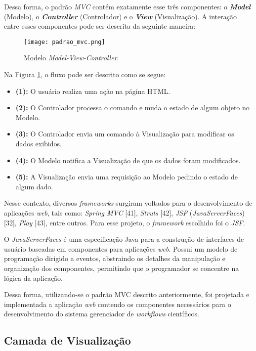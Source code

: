 Dessa forma, o padrão \textit{MVC} contém exatamente esse três componentes: o \textbf{\textit{Model}} (Modelo), o \textbf{\textit{Controller}} (Controlador) e o \textbf{\textit{View}} (Visualização). A interação entre esses componentes pode ser descrita da seguinte maneira:

\begin{figure}[H]
	\centering
	\texttt{[image: padrao\_mvc.png]}
	\caption{Modelo \textit{Model-View-Controller}.}
	\label{fig:padrao_mvc}
\end{figure}

Na Figura \ref{fig:padrao_mvc}, o fluxo pode ser descrito como se segue:

\begin{itemize}
 	\item \textbf{(1):} O usuário realiza uma ação na página HTML.
    \item \textbf{(2):} O Controlador processa o comando e muda o estado de algum objeto no Modelo.
    \item \textbf{(3):} O Controlador envia um comando à Visualização para modificar os dados exibidos.
    \item \textbf{(4):} O Modelo notifica a Visualização de que os dados foram modificados.
    \item \textbf{(5):} A Visualização envia uma requisição ao Modelo pedindo o estado de algum dado.
\end{itemize}

Nesse contexto, diversos \textit{frameworks} surgiram voltados para o desenvolvimento de aplicações \textit{web}, tais como: \textit{Spring MVC} [41], \textit{Struts} [42], \textit{JSF} (\textit{JavaServerFaces}) [32], \textit{Play} [43], entre outros. Para esse projeto, o \textit{framework} escolhido foi o \textit{JSF}.

O \textit{JavaServerFaces} é uma especificação Java para a construção de interfaces de usuário baseadas em componentes para aplicações \textit{web}. Possui um modelo de programação dirigido a eventos, abstraindo os detalhes da manipulação e organização dos componentes, permitindo que o programador se concentre na lógica da aplicação.

Dessa forma, utilizando-se o padrão MVC descrito anteriormente, foi projetada e implementada a aplicação \textit{web} contendo os componentes necessários para o desenvolvimento do sistema gerenciador de \textit{workflows} científicos. 

\subsection{Camada de Visualização} \label{cap5sec3subsec1}

